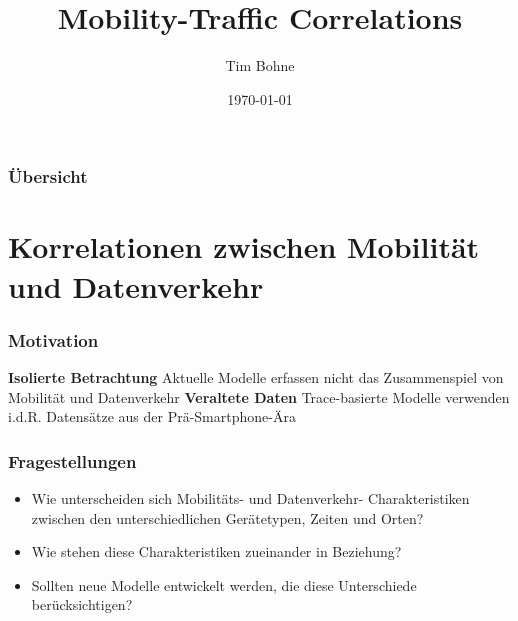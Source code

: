 \documentclass{beamer}
\title[]{Mobility-Traffic Correlations}
\author{Tim Bohne}
\institute[]
{
\textit{Bachelor-Seminar: Mobility and Traffic in Computer Networks}
\medskip
}
\date{\today}
\begin{document}
\begin{frame}[plain] %
\titlepage %
\end{frame}

\begin{frame}
\frametitle{Übersicht} %
\tableofcontents
\end{frame}

\section{Korrelationen zwischen Mobilität und Datenverkehr}

\begin{frame}
\frametitle{Motivation}
\textit{}
\newline\newline\newline
\textbf{Isolierte Betrachtung}\newline
Aktuelle Modelle erfassen nicht das Zusammenspiel von Mobilität und Datenverkehr\newline\newline
\textbf{Veraltete Daten}\newline
Trace-basierte Modelle verwenden i.d.R. Datensätze aus der Prä-Smartphone-Ära
\begin{figure}
\centering
\end{figure}
\end{frame}

\begin{frame}
  \frametitle{Fragestellungen}
  \begin{itemize}
    \item Wie unterscheiden sich Mobilitäts- und Datenverkehr- Charakteristiken zwischen den unterschiedlichen Gerätetypen,
    Zeiten und Orten?\newline
    \item Wie stehen diese Charakteristiken zueinander in Beziehung?\newline
    \item Sollten neue Modelle entwickelt werden, die diese Unterschiede berücksichtigen?
\end{itemize}
\end{frame}
\end{document}
